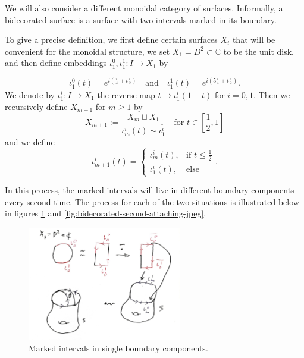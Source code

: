 \documentclass[reqno]{amsart}
\theoremstyle{definition}
\theoremstyle{remark}
\begin{document}
We will also consider a different monoidal category of
surfaces. Informally, a bidecorated surface is a surface with two 
intervals marked in its boundary.


    To give a precise definition, we first
    define certain surfaces $X_i$ that will be convenient for
    the monoidal structure, we set
    $X_1 = D^2 \subset \mathbb{C}$ to be the unit disk,
    and then define embeddings
    $\iota_1^{0}, \iota_1^{1} \colon I \to X_1$ by

    \[
    \iota_1^{0} (t) =
    e^{i \left( \frac{\pi}{4} + t \frac{\pi}{2} \right) }
    \quad
    \text{and}
    \quad
    \iota_{1}^{1} (t) = e^{i \left( 5 \frac{\pi}{4} +
    t \frac{\pi}{2} \right) }.
    \] 
    We denote by
    $\overline{\iota_1^{i}} \colon
    I \to X_1$ the reverse map
    $t \mapsto \iota_{1}^{i}(1-t)$ for $i = 0,1$.
    Then we recursively define $X_{m+1}$ for 
    $m\ge 1$ by
    \[
    X_{m+1} :=
    \frac{X_m \sqcup X_1}{\iota_m^{i}(t) 
\sim \overline{\iota_1^{i}}} \quad \text{for } t
\in \left[ \frac{1}{2},1 \right]
    \] 
    and we define
    \[
    \iota_{m+1}^{i} (t) 
    =
    \begin{cases}
        \iota_m^{i}(t),& \text{if } t \le \frac{1}{2}\\
        \iota_1^{i}(t),& \text{else}
    \end{cases}.
    \] 

    In this process, the marked intervals will live in
    different boundary components every second time. 
    The process for each of the two situations is illustrated below
    in figures
    \ref{fig:bidecorated-attaching-jpeg} and
    \ref{fig:bidecorated-second-attaching-jpeg}.


\begin{figure}[H]
    \centering
    \includegraphics[width=0.6\textwidth]{bidecorated-attaching.jpeg}
    \caption{Marked intervals in single boundary components.}
    \label{fig:bidecorated-attaching-jpeg}
\end{figure}
\end{document}
